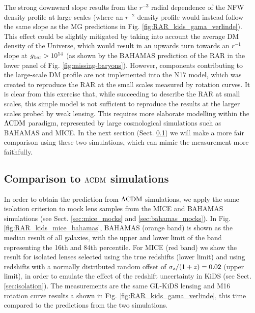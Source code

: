 \documentclass[usenatbib]{mnras}
\newcommand{\lcdm}{{\rm \Lambda CDM}}
\newcommand{\un}[1]{_{\rm #1}}
\begin{document}
The strong downward slope results from the $r^{-3}$ radial dependence of the NFW density profile at large scales (where an $r^{-2}$ density profile would instead follow the same slope as the MG predictions in Fig. \ref{fig:RAR_kids_gama_verlinde}). This effect could be slightly mitigated by taking into account the average DM density of the Universe, which would result in an upwards turn towards an $r^{-1}$ slope at $g\un{bar}>10^{14}$ (as shown by the BAHAMAS prediction of the RAR in the lower panel of Fig. \ref{fig:missing-baryons}). However, components contributing to the large-scale DM profile are not implemented into the N17 model, which was created to reproduce the RAR at the small scales measured by rotation curves. It is clear from this exercise that, while succeeding to describe the RAR at small scales, this simple model is not sufficient to reproduce the results at the larger scales probed by weak lensing. This requires more elaborate modelling within the $\lcdm$ paradigm, represented by large cosmological simulations such as BAHAMAS and MICE. In the next section (Sect. \ref{sec:results-simulations}) we will make a more fair comparison using these two simulations, which can mimic the measurement more faithfully.


\subsection{Comparison to $\lcdm$ simulations}
\label{sec:results-simulations}

In order to obtain the prediction from $\lcdm$ simulations, we apply the same isolation criterion to mock lens samples from the MICE and BAHAMAS simulations (see Sect. \ref{sec:mice_mocks} and \ref{sec:bahamas_mocks}). In Fig. \ref{fig:RAR_kids_mice_bahamas}, BAHAMAS (orange band) is shown as the median result of all galaxies, with the upper and lower limit of the band representing the 16th and 84th percentile. For MICE (red band) we show the result for isolated lenses selected using the true redshifts (lower limit) and using redshifts with a normally distributed random offset of $\sigma\un{z}/(1+z) = 0.02$ (upper limit), in order to emulate the effect of the redshift uncertainty in KiDS (see Sect. \ref{sec:isolation}). The measurements are the same GL-KiDS lensing and M16 rotation curve results a shown in Fig. \ref{fig:RAR_kids_gama_verlinde}, this time compared to the predictions from the two simulations.
\end{document}
